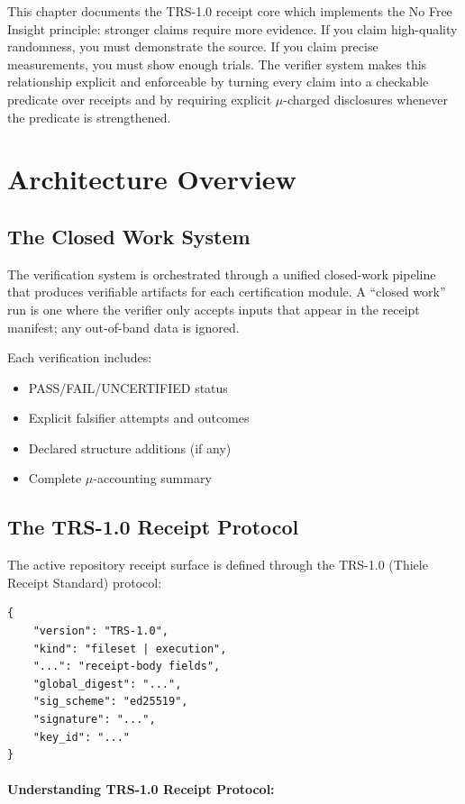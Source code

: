 This chapter documents the TRS-1.0 receipt core which implements the No Free Insight principle: stronger claims require more evidence. If you claim high-quality randomness, you must demonstrate the source. If you claim precise measurements, you must show enough trials. The verifier system makes this relationship explicit and enforceable by turning every claim into a checkable predicate over receipts and by requiring explicit $\mu$-charged disclosures whenever the predicate is strengthened.

\section{Architecture Overview}


\subsection{The Closed Work System}

The verification system is orchestrated through a unified closed-work pipeline that produces verifiable artifacts for each certification module. A ``closed work'' run is one where the verifier only accepts inputs that appear in the receipt manifest; any out-of-band data is ignored.

Each verification includes:
\begin{itemize}
    \item PASS/FAIL/UNCERTIFIED status
    \item Explicit falsifier attempts and outcomes
    \item Declared structure additions (if any)
    \item Complete $\mu$-accounting summary
\end{itemize}

\subsection{The TRS-1.0 Receipt Protocol}

The active repository receipt surface is defined through the TRS-1.0 (Thiele Receipt Standard) protocol:
\begin{lstlisting}
{
    "version": "TRS-1.0",
    "kind": "fileset | execution",
    "...": "receipt-body fields",
    "global_digest": "...",
    "sig_scheme": "ed25519",
    "signature": "...",
    "key_id": "..."
}
\end{lstlisting}

\paragraph{Understanding TRS-1.0 Receipt Protocol:}

